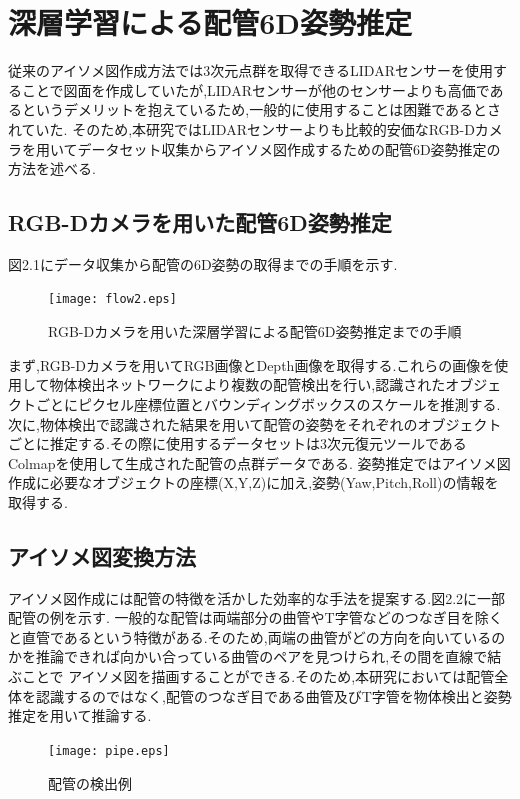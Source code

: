 \chapter{%
深層学習による配管6D姿勢推定}

従来のアイソメ図作成方法では3次元点群を取得できるLIDARセンサーを使用することで図面を作成していたが,LIDARセンサーが他のセンサーよりも高価であるというデメリットを抱えているため,一般的に使用することは困難であるとされていた.
そのため,本研究ではLIDARセンサーよりも比較的安価なRGB-Dカメラを用いてデータセット収集からアイソメ図作成するための配管6D姿勢推定の方法を述べる.

\section{RGB-Dカメラを用いた配管6D姿勢推定}
図2.1にデータ収集から配管の6D姿勢の取得までの手順を示す.

\begin{figure}[htbt]
	\texttt{[image: flow2.eps]}
	\caption{RGB-Dカメラを用いた深層学習による配管6D姿勢推定までの手順}
	\label{fig:f2}
\end{figure}

まず,RGB-Dカメラを用いてRGB画像とDepth画像を取得する.これらの画像を使用して物体検出ネットワークにより複数の配管検出を行い,認識されたオブジェクトごとにピクセル座標位置とバウンディングボックスのスケールを推測する.
次に,物体検出で認識された結果を用いて配管の姿勢をそれぞれのオブジェクトごとに推定する.その際に使用するデータセットは3次元復元ツールであるColmapを使用して生成された配管の点群データである.
姿勢推定ではアイソメ図作成に必要なオブジェクトの座標(X,Y,Z)に加え,姿勢(Yaw,Pitch,Roll)の情報を取得する.

\section{アイソメ図変換方法}
アイソメ図作成には配管の特徴を活かした効率的な手法を提案する.図2.2に一部配管の例を示す.
一般的な配管は両端部分の曲管やT字管などのつなぎ目を除くと直管であるという特徴がある.そのため,両端の曲管がどの方向を向いているのかを推論できれば向かい合っている曲管のペアを見つけられ,その間を直線で結ぶことで
アイソメ図を描画することができる.そのため,本研究においては配管全体を認識するのではなく,配管のつなぎ目である曲管及びT字管を物体検出と姿勢推定を用いて推論する.

\begin{figure}[htbt]
	\centering
	 \texttt{[image: pipe.eps]}
	 \caption{配管の検出例}
	 \label{fig:f2}
\end{figure}


